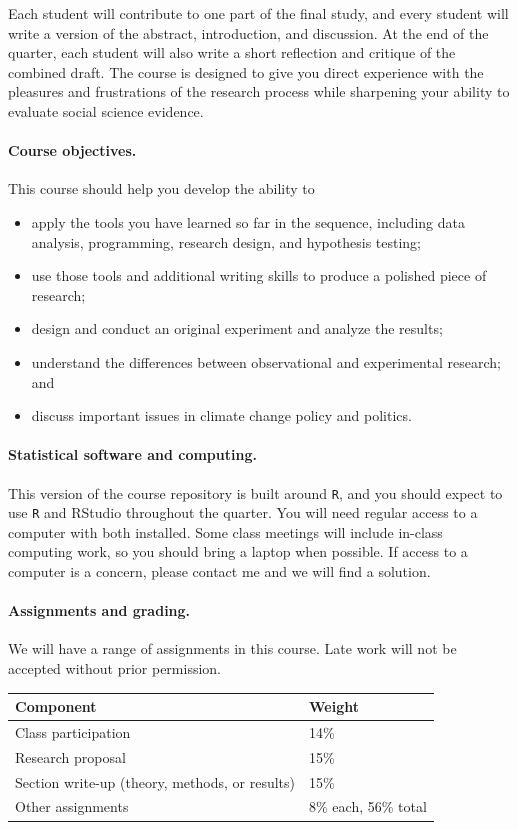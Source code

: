 \documentclass[letterpaper, 12pt, parskip=full, DIV=10]{scrartcl}
\begin{document}
Each student will contribute to one part of the final study, and every student will write a version of the abstract, introduction, and discussion. At the end of the quarter, each student will also write a short reflection and critique of the combined draft. The course is designed to give you direct experience with the pleasures and frustrations of the research process while sharpening your ability to evaluate social science evidence.

\paragraph{Course objectives.}
This course should help you develop the ability to
\begin{itemize}
\item apply the tools you have learned so far in the sequence, including data analysis, programming, research design, and hypothesis testing;
\item use those tools and additional writing skills to produce a polished piece of research;
\item design and conduct an original experiment and analyze the results;
\item understand the differences between observational and experimental research; and
\item discuss important issues in climate change policy and politics.
\end{itemize}

\paragraph{Statistical software and computing.}
This version of the course repository is built around \texttt{R}, and you should expect to use \texttt{R} and RStudio throughout the quarter. You will need regular access to a computer with both installed. Some class meetings will include in-class computing work, so you should bring a laptop when possible. If access to a computer is a concern, please contact me and we will find a solution.

\paragraph{Assignments and grading.}
We will have a range of assignments in this course. Late work will not be accepted without prior permission.

\begin{center}
\begin{tabular}{l l}
\textbf{Component} & \textbf{Weight} \\
\hline
Class participation & 14\% \\
Research proposal & 15\% \\
Section write-up (theory, methods, or results) & 15\% \\
Other assignments & 8\% each, 56\% total \\
\end{tabular}
\end{center}
\end{document}
